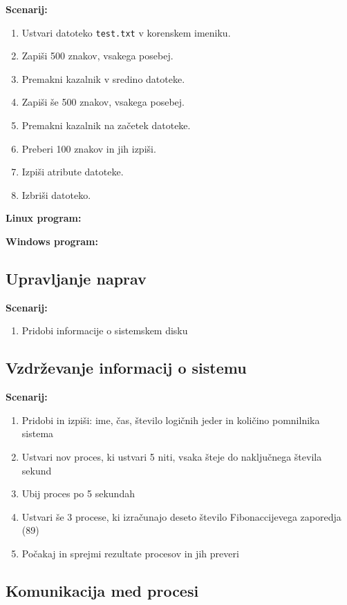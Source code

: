 \documentclass[a4paper,12pt,openright]{book}
\begin{document}
\textbf{Scenarij:}
\begin{enumerate}
	\item Ustvari datoteko \texttt{test.txt} v korenskem imeniku.
	\item Zapiši 500 znakov, vsakega posebej.
	\item Premakni kazalnik v sredino datoteke.
	\item Zapiši še 500 znakov, vsakega posebej.
	\item Premakni kazalnik na začetek datoteke.
	\item Preberi 100 znakov in jih izpiši.
	\item Izpiši atribute datoteke.
	\item Izbriši datoteko.
\end{enumerate}

\textbf{Linux program:}


\textbf{Windows program:}


\subsection{Upravljanje naprav}

\textbf{Scenarij:}
\begin{enumerate}
	\item Pridobi informacije o sistemskem disku
\end{enumerate}

\subsection{Vzdrževanje informacij o sistemu}

\textbf{Scenarij:}
\begin{enumerate}
	\item Pridobi in izpiši: ime, čas, število logičnih jeder in količino pomnilnika sistema
	\item Ustvari nov proces, ki ustvari 5 niti, vsaka šteje do naključnega števila sekund
	\item Ubij proces po 5 sekundah
	\item Ustvari še 3 procese, ki izračunajo deseto število Fibonaccijevega zaporedja (89)
	\item Počakaj in sprejmi rezultate procesov in jih preveri
\end{enumerate}

\subsection{Komunikacija med procesi}
\end{document}

